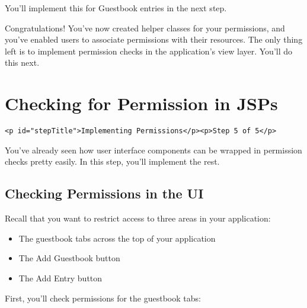 You'll implement this for Guestbook entries in the next step.

Congratulations! You've now created helper classes for your permissions,
and you've enabled users to associate permissions with their resources.
The only thing left is to implement permission checks in the
application's view layer. You'll do this next.

\chapter{Checking for Permission in
JSPs}\label{checking-for-permission-in-jsps}

\begin{verbatim}
<p id="stepTitle">Implementing Permissions</p><p>Step 5 of 5</p>
\end{verbatim}

You've already seen how user interface components can be wrapped in
permission checks pretty easily. In this step, you'll implement the
rest.

\section{Checking Permissions in the
UI}\label{checking-permissions-in-the-ui}

Recall that you want to restrict access to three areas in your
application:

\begin{itemize}
\tightlist
\item
  The guestbook tabs across the top of your application
\item
  The Add Guestbook button
\item
  The Add Entry button
\end{itemize}

First, you'll check permissions for the guestbook tabs:

